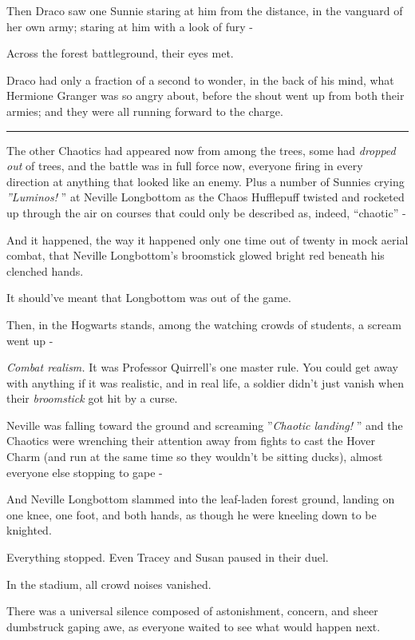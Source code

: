 Then Draco saw one Sunnie staring at him from the distance, in the
vanguard of her own army; staring at him with a look of fury -

Across the forest battleground, their eyes met.

Draco had only a fraction of a second to wonder, in the back of his
mind, what Hermione Granger was so angry about, before the shout went up
from both their armies; and they were all running forward to the charge.

\begin{center}\rule{3in}{0.4pt}\end{center}

The other Chaotics had appeared now from among the trees, some had
\emph{dropped out} of trees, and the battle was in full force now,
everyone firing in every direction at anything that looked like an
enemy. Plus a number of Sunnies crying \emph{''Luminos!} '' at Neville
Longbottom as the Chaos Hufflepuff twisted and rocketed up through the
air on courses that could only be described as, indeed, ``chaotic'' -

And it happened, the way it happened only one time out of twenty in mock
aerial combat, that Neville Longbottom's broomstick glowed bright red
beneath his clenched hands.

It should've meant that Longbottom was out of the game.

Then, in the Hogwarts stands, among the watching crowds of students, a
scream went up -

\emph{Combat realism.} It was Professor Quirrell's one master rule. You
could get away with anything if it was realistic, and in real life, a
soldier didn't just vanish when their \emph{broomstick} got hit by a
curse.

Neville was falling toward the ground and screaming ''\emph{Chaotic
landing!} '' and the Chaotics were wrenching their attention away from
fights to cast the Hover Charm (and run at the same time so they
wouldn't be sitting ducks), almost everyone else stopping to gape -

And Neville Longbottom slammed into the leaf-laden forest ground,
landing on one knee, one foot, and both hands, as though he were
kneeling down to be knighted.

Everything stopped. Even Tracey and Susan paused in their duel.

In the stadium, all crowd noises vanished.

There was a universal silence composed of astonishment, concern, and
sheer dumbstruck gaping awe, as everyone waited to see what would happen
next.

